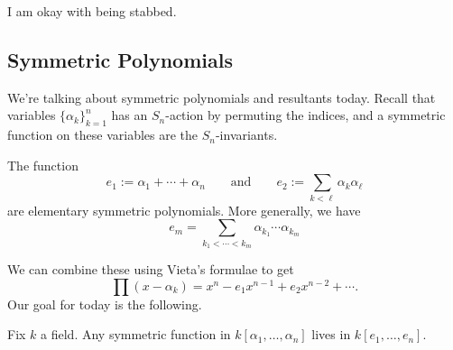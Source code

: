 \documentclass[../notes.tex]{subfiles}
\begin{document}
















I am okay with being stabbed.

\subsection{Symmetric Polynomials}
We're talking about symmetric polynomials and resultants today. Recall that variables $\{\alpha_k\}_{k=1}^n$ has an $S_n$-action by permuting the indices, and a symmetric function on these variables are the $S_n$-invariants.
\begin{example}
	The function
	\[e_1:=\alpha_1+\cdots+\alpha_n\qquad\text{and}\qquad e_2:=\sum_{k<\ell}\alpha_k\alpha_\ell\]
	are elementary symmetric polynomials. More generally, we have
	\[e_m=\sum_{k_1<\cdots<k_m}\alpha_{k_1}\cdots\alpha_{k_m}\]
\end{example}
We can combine these using {Vieta}'s formulae to get
\[\prod(x-\alpha_k)=x^n-e_1x^{n-1}+e_2x^{n-2}+\cdots.\]
Our goal for today is the following.
\begin{theorem} \label{thm:fundsymm}
	Fix $k$ a field. Any symmetric function in $k[\alpha_1,\ldots,\alpha_n]$ lives in $k[e_1,\ldots,e_n].$
\end{theorem}
\end{document}
